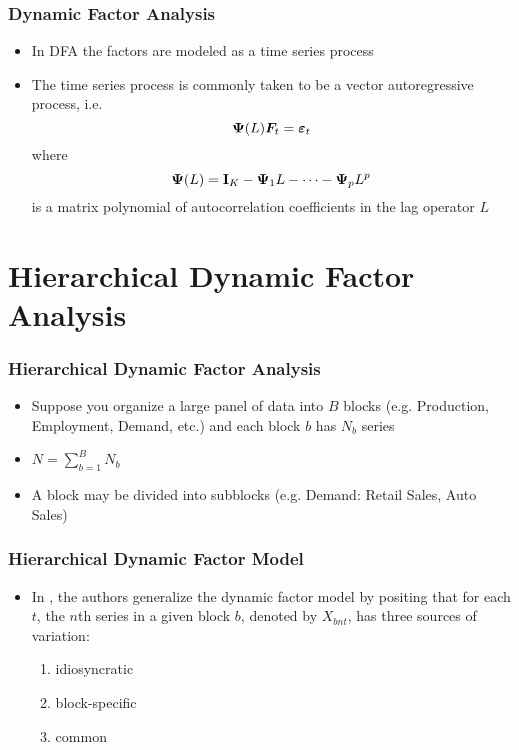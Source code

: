 \documentclass[10pt, compress, notheorems, aspectratio=169]{beamer}
\let\originalleft\left
\let\originalright\right
\renewcommand{\left}{\mathopen{}\mathclose \bgroup \originalleft}
\renewcommand{\right}{\aftergroup \egroup \originalright}
\begin{document}
\begin{frame}
	\frametitle{Dynamic Factor Analysis}
	\begin{itemize}
		\item In DFA the factors are modeled as a time series process
		\item The time series process is commonly taken to be a vector autoregressive process, i.e.
			\begin{equation}
				{\bm \Psi} \left( L \right) {\bm F}_t = {\bm \varepsilon}_t
			\end{equation}
			where 
			\begin{equation*}
				{\bm \Psi} \left( L \right) = {\bf I}_K - {\bm \Psi}_1 L - \cdots  - {\bm \Psi}_p L^p
			\end{equation*}
			is a matrix polynomial of autocorrelation coefficients in the lag operator $L$
	\end{itemize}
\end{frame}

\section{Hierarchical Dynamic Factor Analysis}

\begin{frame}
	\frametitle{Hierarchical Dynamic Factor Analysis}
	\begin{itemize}
		\item Suppose you organize a large panel of data into $B$ blocks (e.g. Production, Employment, Demand, etc.) and each block $b$ has $N_b$ series
		\item $N = \sum_{b=1}^B N_b$
		\item A block may be divided into subblocks (e.g. Demand: Retail Sales, Auto Sales)
	\end{itemize}
\end{frame}

\begin{frame}
	\frametitle{Hierarchical Dynamic Factor Model}
	\begin{itemize}
		\item In \cite{moenchDynamicHierarchicalFactor2013}, the authors generalize the dynamic factor model by positing that for each $t$, the $n$th series in a given block $b$, denoted by $ X_{bnt}$, has three sources of variation:
			\begin{enumerate}
				\item idiosyncratic
				\item block-specific 
				\item common
			\end{enumerate}
	\end{itemize}
\end{frame}
\end{document}
